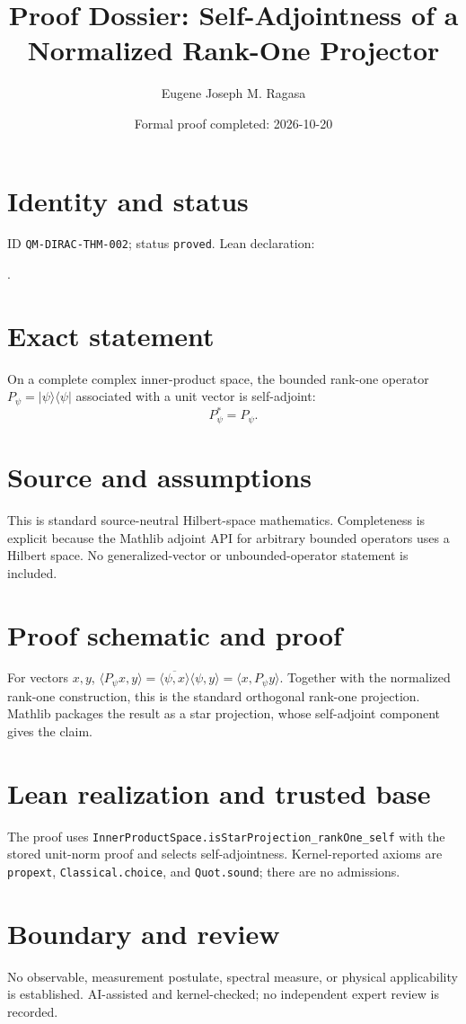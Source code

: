 \documentclass[11pt]{article}
\title{Proof Dossier: Self-Adjointness of a Normalized Rank-One Projector}\author{Eugene Joseph M. Ragasa}\date{Formal proof completed: 2026-10-20}
\begin{document}
\maketitle
\section{Identity and status}
ID \texttt{QM-DIRAC-THM-002}; status \texttt{proved}. Lean declaration:
\par{}.
\section{Exact statement}
On a complete complex inner-product space, the bounded rank-one operator
$P_\psi=\lvert\psi\rangle\langle\psi\rvert$ associated with a unit vector is self-adjoint:
\[P_\psi^*=P_\psi.\]
\section{Source and assumptions}
This is standard source-neutral Hilbert-space mathematics. Completeness is explicit because the
Mathlib adjoint API for arbitrary bounded operators uses a Hilbert space. No generalized-vector or
unbounded-operator statement is included.
\section{Proof schematic and proof}
For vectors $x,y$,
$\langle P_\psi x,y\rangle=\overline{\langle\psi,x\rangle}\langle\psi,y\rangle
=\langle x,P_\psi y\rangle$.
Together with the normalized rank-one construction, this is the standard orthogonal rank-one
projection. Mathlib packages the result as a star projection, whose self-adjoint component gives the
claim.
\section{Lean realization and trusted base}
The proof uses \texttt{InnerProductSpace.isStarProjection\_rankOne\_self} with the stored unit-norm
proof and selects self-adjointness. Kernel-reported axioms are \texttt{propext},
\texttt{Classical.choice}, and \texttt{Quot.sound}; there are no admissions.
\section{Boundary and review}
No observable, measurement postulate, spectral measure, or physical applicability is established.
AI-assisted and kernel-checked; no independent expert review is recorded.
\end{document}
